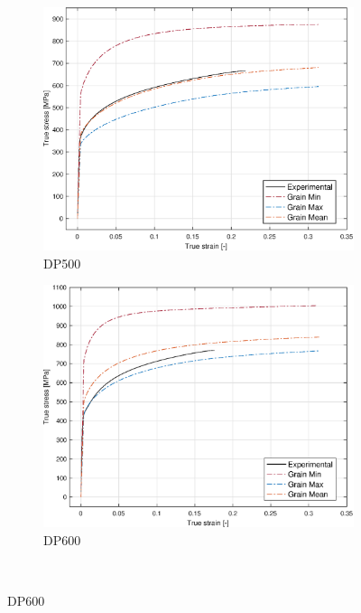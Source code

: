 \documentclass{article}
\begin{document}
\begin{figure}[h!]
     \centering
     \begin{subfigure}[b]{0.45\textwidth}
         \centering
         \includegraphics[width=\textwidth]{Grain500.eps}
         \caption{DP500}
         \label{fig:Grain500}
     \end{subfigure}
     \begin{subfigure}[b]{0.45\textwidth}
         \centering
         \includegraphics[width=\textwidth]{Grain600.eps}
         \caption{DP600}
         \label{fig:Grain600}
     \end{subfigure}
          \hfill\\

\end{figure}
\end{document}
